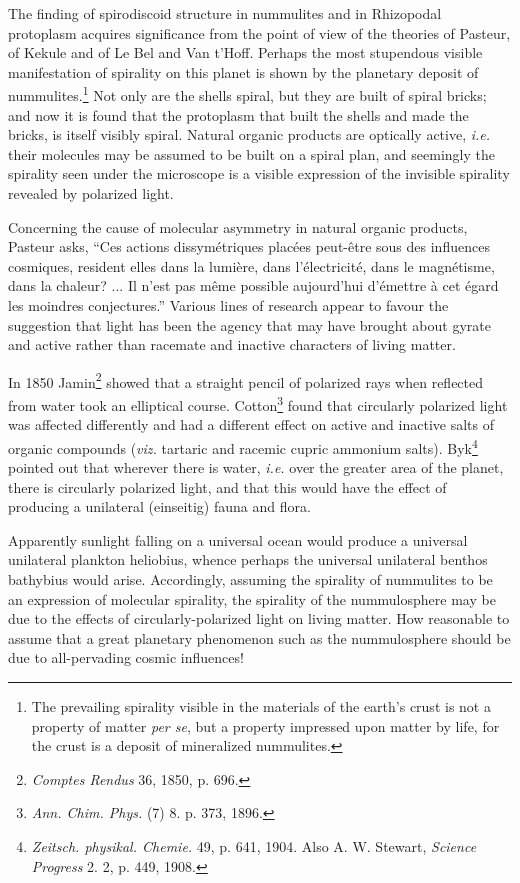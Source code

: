 \documentclass[a4paper, 12pt, oneside]{article}
\begin{document}
The finding of spirodiscoid structure in nummulites and in Rhizopodal protoplasm acquires significance from the point of view of the theories of Pasteur, of Kekule and of Le Bel and Van t'Hoff. Perhaps the most stupendous visible manifestation of spirality on this planet is shown by the planetary deposit of nummulites.\footnote{The prevailing spirality visible in the materials of the earth's crust is not a property of matter \emph{per se}, but a property impressed upon matter by life, for the crust is a deposit of mineralized nummulites.} Not only are the shells spiral, but they are built of spiral bricks; and now it is found that the protoplasm that built the shells and made the bricks, is itself visibly spiral. Natural organic products are optically active, \emph{i.e.} their molecules may be assumed to be built on a spiral plan, and seemingly the spirality seen under the microscope is a visible expression of the invisible spirality revealed by polarized light.

Concerning the cause of molecular asymmetry in natural organic products, Pasteur asks, ``Ces actions dissymétriques placées peut-être sous des influences cosmiques, resident elles dans la lumière, dans l'électricité, dans le magnétisme, dans la chaleur? ... Il n'est pas même possible aujourd'hui d'émettre à cet égard les moindres conjectures.'' Various lines of research appear to favour the suggestion that light has been the agency that may have brought about gyrate and active rather than racemate and inactive characters of living matter.

In 1850 Jamin\footnote{\emph{Comptes Rendus} 36, 1850, p. 696.} showed that a straight pencil of polarized rays when reflected from water took an elliptical course. Cotton\footnote{\emph{Ann. Chim. Phys.} (7) 8. p. 373, 1896.} found that circularly polarized light was affected differently and had a different effect on active and inactive salts of organic compounds (\emph{viz.} tartaric and racemic cupric ammonium salts). Byk\footnote{\emph{Zeitsch. physikal. Chemie.} 49, p. 641, 1904. Also A. W. Stewart, \emph{Science Progress} 2. 2, p. 449, 1908.} pointed out that wherever there is water, \emph{i.e.} over the greater area of the planet, there is circularly polarized light, and that this would have the effect of producing a unilateral (einseitig) fauna and flora.

Apparently sunlight falling on a universal ocean would produce a universal unilateral plankton heliobius, whence perhaps the universal unilateral benthos bathybius would arise. Accordingly, assuming the spirality of nummulites to be an expression of molecular spirality, the spirality of the nummulosphere may be due to the effects of circularly-polarized light on living matter. How reasonable to assume that a great planetary phenomenon such as the nummulosphere should be due to all-pervading cosmic influences!
\end{document}
